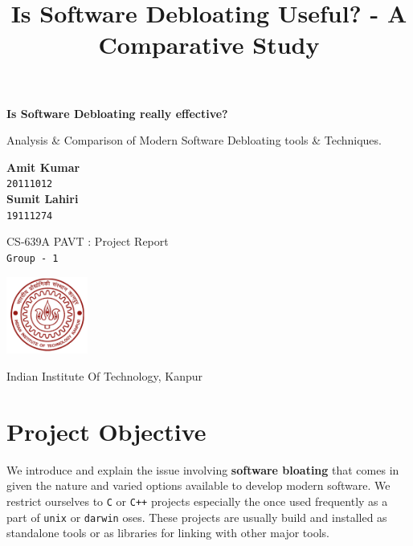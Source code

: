 \documentclass{relatorio}
\title{Is Software Debloating Useful? - A Comparative Study}
\begin{document}
\begin{titlepage}
	\begin{center}
		\vspace*{2cm}
		
		\textbf{Is Software Debloating really effective?}
		
		\vspace{0.5cm}
		Analysis \& Comparison of Modern Software Debloating tools \& Techniques.
		
		\vspace{1.5cm} 
		\textbf{Amit Kumar} \\
		\texttt{20111012} \\
		\vspace{1.5cm}
		\textbf{Sumit Lahiri} \\
		\texttt{19111274} \\
		\vfill
		
		CS-639A PAVT : Project Report \\
		\texttt{Group - 1} \\
		\vspace{0.8cm}
		
		\includegraphics[width=0.2\textwidth]{imgs/university.jpg}
		
		\Large
		Indian Institute Of Technology, Kanpur
		
	\end{center}
\end{titlepage}
	
	\onecolumn
	\tableofcontents
	\twocolumn  
	
	\maketitle{}

\section{Project Objective}%

We introduce and explain the issue involving \textbf{software bloating} that comes in given the nature and varied options 
available to develop modern software. We restrict ourselves to \texttt{C} or \texttt{C++} projects especially the once used frequently
as a part of \texttt{unix} or \texttt{darwin} oses. These projects are usually build and installed as standalone tools or as libraries 
for linking with other major tools. 
\end{document}
